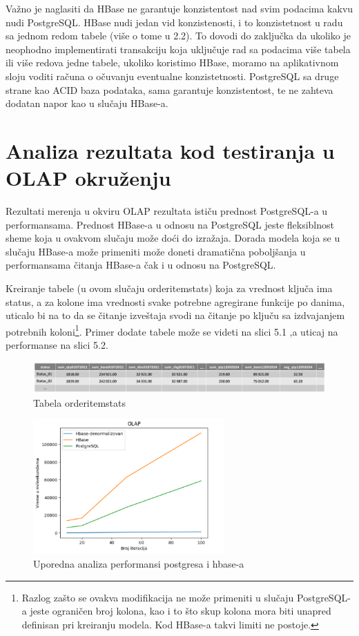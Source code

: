 \documentclass[12pt,oneside]{memoir}
\begin{document}
Važno je naglasiti da HBase ne garantuje konzistentost nad svim podacima kakvu nudi PostgreSQL. HBase nudi jedan vid konzistenosti, i to konzistetnost u radu sa jednom redom tabele (više o tome u 2.2). To dovodi do zaključka da ukoliko je neophodno implementirati transakciju koja uključuje rad sa podacima više tabela ili više redova jedne tabele, ukoliko koristimo HBase, moramo na aplikativnom sloju voditi računa o očuvanju  eventualne konzistetnosti. PostgreSQL sa druge strane kao ACID baza podataka, sama garantuje konzistentost, te ne zahteva dodatan napor kao u slučaju HBase-a. 

\section{Analiza rezultata kod testiranja u OLAP okruženju}

Rezultati merenja u okviru OLAP rezultata ističu prednost PostgreSQL-a u performansama. Prednost HBase-a u odnosu na PostgreSQL jeste fleksiblnost sheme koja u ovakvom slučaju može doći do izražaja. Dorada modela koja se u slučaju HBase-a može primeniti može doneti dramatična poboljšanja u performansama čitanja HBase-a čak i u odnosu na PostgreSQL. 

Kreiranje tabele (u ovom slučaju orderitemstats) koja za vrednost ključa ima status, a za kolone ima vrednosti svake potrebne agregirane funkcije po danima, uticalo bi na to da se čitanje izveštaja svodi na čitanje po ključu sa izdvajanjem potrebnih koloni\footnote{ Razlog zašto se ovakva modifikacija ne može primeniti u slučaju PostgreSQL-a jeste ograničen broj kolona, kao i to što skup kolona mora biti unapred definisan pri kreiranju modela. Kod HBase-a takvi limiti ne postoje.}.
Primer dodate tabele može se videti na slici 5.1 ,a uticaj na performanse na slici 5.2.

\begin{figure}[!ht]
  \centering
  \includegraphics[width=1\textwidth]{denormalized-model.png}
  \caption{Tabela orderitemstats}
  \label{fig:grafikon}
\end{figure}

\begin{figure}[!ht]
  \centering
  \includegraphics[width=0.65\textwidth]{olap-vizualization.png}
  \caption{Uporedna analiza performansi postgresa i hbase-a}
  \label{fig:grafikon}
\end{figure}
\end{document}

